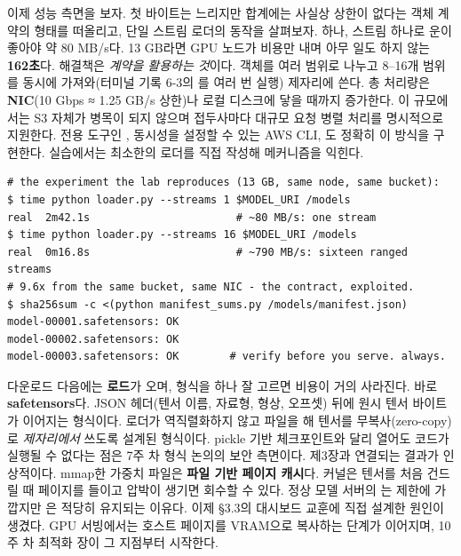 이제 성능 측면을 보자. 첫 바이트는 느리지만 합계에는 사실상 상한이 없다는 객체 계약의 형태를 떠올리고, 단일 스트림 로더의 동작을 살펴보자.  하나, 스트림 하나로 운이 좋아야 약 80 MB/s다. 13 GB라면 GPU 노드가 비용만 내며 아무 일도 하지 않는 \textbf{162초}다. 해결책은 \textit{계약을 활용하는 것}이다. 객체를 여러 범위로 나누고 8–16개 범위를 동시에 가져와(터미널 기록 6-3의 를 여러 번 실행) 제자리에 쓴다. 총 처리량은 \textbf{NIC}(10 Gbps ≈ 1.25 GB/s 상한)나 로컬 디스크에 닿을 때까지 증가한다. 이 규모에서는 S3 자체가 병목이 되지 않으며 접두사마다 대규모 요청 병렬 처리를 명시적으로 지원한다. 전용 도구인 , 동시성을 설정할 수 있는 AWS CLI, 도 정확히 이 방식을 구현한다. 실습에서는 최소한의 로더를 직접 작성해 메커니즘을 익힌다.

\begin{terminalbox}
\begin{Verbatim}[breaklines=true,breakanywhere=true,fontsize=\small,formatcom=\color{tbbtermfg},codes=\tbbcodeactive]
# the experiment the lab reproduces (13 GB, same node, same bucket):
$ time python loader.py --streams 1 $MODEL_URI /models
real  2m42.1s                       # ~80 MB/s: one stream
$ time python loader.py --streams 16 $MODEL_URI /models
real  0m16.8s                       # ~790 MB/s: sixteen ranged streams
# 9.6x from the same bucket, same NIC - the contract, exploited.
$ sha256sum -c <(python manifest_sums.py /models/manifest.json)
model-00001.safetensors: OK
model-00002.safetensors: OK
model-00003.safetensors: OK        # verify before you serve. always.
\end{Verbatim}
\end{terminalbox}

다운로드 다음에는 \textbf{로드}가 오며, 형식을 하나 잘 고르면 비용이 거의 사라진다. 바로 \textbf{safetensors}다. JSON 헤더(텐서 이름, 자료형, 형상, 오프셋) 뒤에 원시 텐서 바이트가 이어지는 형식이다. 로더가 역직렬화하지 않고 파일을 해 텐서를 무복사(zero-copy)로 \textit{제자리에서} 쓰도록 설계된 형식이다. pickle 기반 체크포인트와 달리 열어도 코드가 실행될 수 없다는 점은 7주 차 형식 논의의 보안 측면이다. 제3장과 연결되는 결과가 인상적이다. mmap한 가중치 파일은 \textbf{파일 기반 페이지 캐시}다. 커널은 텐서를 처음 건드릴 때 페이지를 들이고 압박이 생기면 회수할 수 있다. 정상 모델 서버의 는 제한에 가깝지만 은 적당히 유지되는 이유다. 이제 §3.3의 대시보드 교훈에 직접 설계한 원인이 생겼다. GPU 서빙에서는 호스트 페이지를 VRAM으로 복사하는 단계가 이어지며, 10주 차 최적화 장이 그 지점부터 시작한다.

